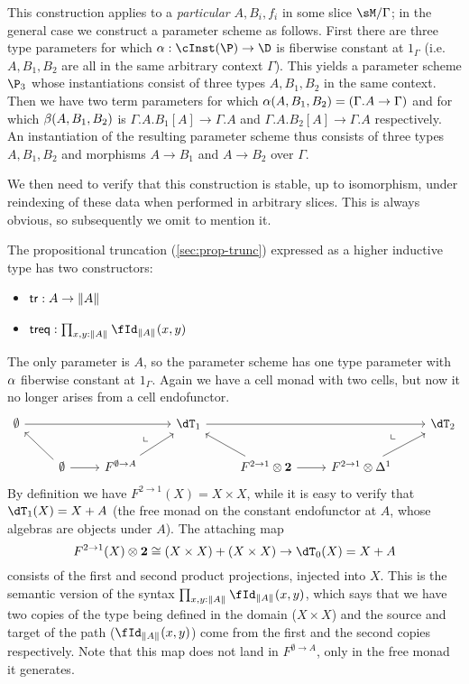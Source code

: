 \begin{enumerate}
\begin{enumerate}
\begin{eg}
  This construction applies to a \emph{particular} $A,B_i,f_i$ in some slice $\sM/\Gamma$; in the general case we construct a parameter scheme as follows.
  First there are three type parameters for which $\al:\cInst(\P)\to\D$ is fiberwise constant at $1_\Gamma$ (i.e.\ $A,B_1,B_2$ are all in the same arbitrary context $\Gamma$).
  This yields a parameter scheme $\P_3$ whose instantiations consist of three types $A,B_1,B_2$ in the same context.
  Then we have two term parameters for which $\alpha(A,B_1,B_2) = (\Gamma.A\to \Gamma)$ and for which $\beta(A,B_1,B_2)$ is $\Gamma.A.B_1[A]\to \Gamma.A$ and $\Gamma.A.B_2[A]\to \Gamma.A$ respectively.
  An instantiation of the resulting parameter scheme thus consists of three types $A,B_1,B_2$ and morphisms $A\to B_1$ and $A\to B_2$ over $\Gamma$.

  We then need to verify that this construction is stable, up to isomorphism, under reindexing of these data when performed in arbitrary slices.
  This is always obvious, so subsequently we omit to mention it.
\end{eg}

\begin{eg} \label{eg:prop-trunc}
  The propositional truncation (\cref{sec:prop-trunc}) expressed as a higher inductive type has two constructors:
  \begin{itemize}
  \item $\mathsf{tr}:A \to\mathopen{}\left\Vert A\right\Vert_{}\mathclose{}$
  \item $\treq : \prod_{x,y:\brck A} \id[\brck A]{x}{y}$
  \end{itemize}
  The only parameter is $A$, so the parameter scheme has one type parameter with $\alpha$ fiberwise constant at $1_\Gamma$.
  Again we have a cell monad with two cells, but now it no longer arises from a cell endofunctor.
  \[
  \begin{tikzcd}
    \emptyset \ar[rrr] &&& \dT_1 \ar[rrr] &&& \dT_2 \\
    & \emptyset \ar[ul] \ar[r] \ar[urr,phantom,near end,"\llcorner"] & F^{\emptyset\to A} \ar[ur] &
    & F^{2\to 1} \otimes \mathbf{2} \ar[ul] \ar[r] \ar[urr,phantom,near end,"\llcorner"] & F^{2\to 1} \otimes \ivl \ar[ur]
  \end{tikzcd}
  \]
  By definition we have $F^{2\to 1}(X) = X\times X$, while it is easy to verify that $\dT_1(X) = X+A$ (the free monad on the constant endofunctor at $A$, whose algebras are objects under $A$).
  The attaching map
  \[F^{2\to 1}(X)\otimes \mathbf{2} \cong (X\times X) + (X\times X) \to \dT_0(X) = X+A\]
  consists of the first and second product projections, injected into $X$.
  This is the semantic version of the syntax $\prod_{x,y:\brck A} \id[\brck A]{x}{y}$, which says that we have two copies of the type being defined in the domain ($X\times X$) and the source and target of the path ($\id[\brck A]{x}{y}$) come from the first and the second copies respectively.
  Note that this map does not land in $F^{\emptyset\to A}$, only in the free monad it generates.
\end{eg}


\end{enumerate}
\end{enumerate}
